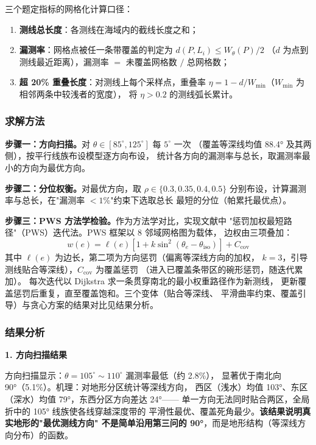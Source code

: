 \documentclass[withoutpreface,bwprint]{cumcmthesis} %
\begin{document}
三个题定指标的网格化计算口径：
\begin{enumerate}
    \item \textbf{测线总长度}：各测线在海域内的截线长度之和；
    \item \textbf{漏测率}：网格点被任一条带覆盖的判定为 $d(P,L_i)\le W_\theta(P)/2$
      （$d$ 为点到测线最近距离），漏测率 $=$ 未覆盖网格数 $/$ 总网格数；
    \item \textbf{超 20\% 重叠长度}：对测线上每个采样点，重叠率
      $\eta=1-d/W_{\min}$（$W_{\min}$ 为相邻两条中较浅者的宽度），
      将 $\eta>0.2$ 的测线弧长累计。
\end{enumerate}

\subsubsection{求解方法}

\textbf{步骤一：方向扫描。}对 $\theta\in[85^\circ,125^\circ]$ 每 $5^\circ$ 一次
（覆盖等深线均值 88.4° 及其两侧），按平行线族布设模型逐方向布设，
统计各方向的漏测率与总长，取漏测率最小的方向为最优方向。

\textbf{步骤二：分位权衡。}对最优方向，取 $\rho\in\{0.3,0.35,0.4,0.5\}$
分别布设，计算漏测率与总长，在"漏测率 $<1\%$"约束下选取总长
最短的分位（帕累托最优点）。

\textbf{步骤三：PWS 方法学检验。}作为方法学对比，实现文献中
"惩罚加权最短路径"（PWS）迭代法。PWS 框架以 8 邻域网格图为载体，
边权由三项叠加：
\begin{equation}
    w(e) = \ell(e)\left[1 + k\sin^2(\theta_e - \theta_{\text{iso}})\right] + C_{\text{cov}}
\end{equation}
其中 $\ell(e)$ 为边长，第二项为方向惩罚（偏离等深线方向的加权，
$k=3$，引导测线贴合等深线），$C_{\text{cov}}$ 为覆盖惩罚
（进入已覆盖条带区的碗形惩罚，随迭代累加）。
每次迭代以 Dijkstra\cite{bib:dijkstra} 求一条贯穿南北的最小权重路径作为新测线，
更新覆盖惩罚后重复，直至覆盖饱和。三个变体（贴合等深线、
平滑曲率约束、覆盖引导）与贪心方案的结果对比见结果分析。

\subsubsection{结果分析}

\textbf{1. 方向扫描结果}

方向扫描显示：$\theta=105^\circ\sim110^\circ$ 漏测率最低（约 2.8\%），
显著优于南北向 90°（5.1\%）。机理：对地形分区统计等深线方向，
西区（浅水）均值 103°、东区（深水）均值 79°，东西分区方向差达 24°——
单一方向无法同时贴合两区，全局折中的 105° 线族使各线穿越深度带的
平滑性最优、覆盖死角最少。\textbf{该结果说明真实地形的"最优测线方向"
不是简单沿用第三问的 90°}，而是地形结构（等深线方向分布）的函数。
\end{document}
